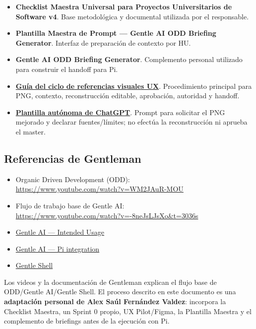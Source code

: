 \documentclass[11pt,a4paper]{article}
\newcommand{\responsable}{Alex Saúl Fernández Valdez}
\begin{document}
\begin{itemize}
    \item \textbf{Checklist Maestra Universal para Proyectos Universitarios de Software v4}. Base metodológica y documental utilizada por el responsable.
    \item \textbf{Plantilla Maestra de Prompt — Gentle AI ODD Briefing Generator}. Interfaz de preparación de contexto por HU.
    \item \textbf{Gentle AI ODD Briefing Generator}. Complemento personal utilizado para construir el handoff para Pi.
    \item \href{https://github.com/Alex-Fernandez-2003/workflow-with-gentle-ai/blob/docs/workflow-showcase/docs/ux/flujo-referencias-visuales.md}{\textbf{Guía del ciclo de referencias visuales UX}}. Procedimiento principal para PNG, contexto, reconstrucción editable, aprobación, autoridad y handoff.
    \item \href{https://github.com/Alex-Fernandez-2003/workflow-with-gentle-ai/blob/docs/workflow-showcase/docs/ux/plantilla-chatgpt-mejora-referencias-visuales.md}{\textbf{Plantilla autónoma de ChatGPT}}. Prompt para solicitar el PNG mejorado y declarar fuentes/límites; no efectúa la reconstrucción ni aprueba el master.
\end{itemize}

\subsection*{Referencias de Gentleman}

\begin{itemize}
    \item Organic Driven Development (ODD):\\
    \url{https://www.youtube.com/watch?v=WM2JAuR-MOU}
    \item Flujo de trabajo base de Gentle AI:\\
    \url{https://www.youtube.com/watch?v=-8neJsLJsXo&t=3036s}
    \item \href{https://github.com/Gentleman-Programming/gentle-ai/blob/main/docs/intended-usage.md}{Gentle AI — Intended Usage}
    \item \href{https://github.com/Gentleman-Programming/gentle-ai/blob/main/docs/pi.md}{Gentle AI — Pi integration}
    \item \href{https://github.com/Gentleman-Programming/gentle-shell}{Gentle Shell}
\end{itemize}

\begin{notebox}
Los videos y la documentación de Gentleman explican el flujo base de ODD/Gentle AI/Gentle Shell. El proceso descrito en este documento es una \textbf{adaptación personal de \responsable}: incorpora la Checklist Maestra, un Sprint 0 propio, UX Pilot/Figma, la Plantilla Maestra y el complemento de briefings antes de la ejecución con Pi.
\end{notebox}
\end{document}
